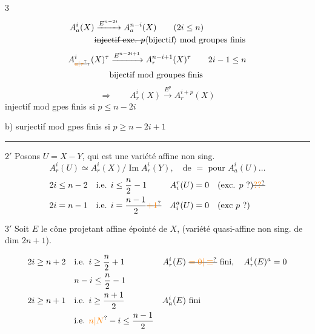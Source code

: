 \textcircled{3}
\[
\begin{aligned}
 A_a^i(X)&\xrightarrow{E^{n-2i}} A_a^{n-i}(X)\qquad(2i\leq n)\\
 &\text{\deleted{injectif exc. $p$}\inserted{bijectif} mod groupes finis}
\end{aligned}
\]
\[
\begin{aligned}
 A^i_{\deleted{\unsure{a|\tau}}r}(X)^\tau
 &\xrightarrow{E^{n-2i+1}} A_r^{n-i+1}(X)^\tau\qquad 2i-1\leq n\\
 &\text{bijectif mod groupes finis}
\end{aligned}
\]
\[
 \Longrightarrow\qquad A^i_r(X)\xrightarrow{E^p}A^{i+p}_r(X)
\]
 injectif mod gpes finis si $p\leq n-2i$

b) surjectif mod gpes finis si $p\geq n-2i+1$

\noindent\rule{\linewidth}{0.35pt}
\textcircled{$2'$} Posons $U=X-Y$, qui est une variété affine non sing.
\[
 A^i_r(U)\simeq A^i_r(X)/\operatorname{Im} A^i_r(Y),\quad
 \text{de }=\text{ pour } A^i_a(U)\ldots
\]
\[
\begin{aligned}
 2i\leq n-2&\quad\text{i.e. }i\leq\frac n2-1&
 A_i^r(U)&=0\quad(\text{exc. $p$ ?})\deleted{\unsure{??}}\\
 2i=n-1&\quad\text{i.e. }i=\frac{n-1}2\deleted{\unsure{+1}}&
 A_i^a(U)&=0\quad(\text{exc $p$ ?})
\end{aligned}
\]

\textcircled{$3'$} Soit $E$ le cône projetant affine épointé de $X$, (variété quasi-affine non sing. de dim $2n+1$).

\[
\begin{aligned}
 2i\geq n+2&\quad\text{i.e. } i\geq\frac n2+1&
 A_r^i(E)&\ \deleted{\unsure{=0|\equiv}}\text{ fini},\quad A^i_r(E)^a=0\\
 &\quad n-i\leq\frac n2-1\\
 2i\geq n+1&\quad\text{i.e. } i\geq\frac{n+1}2&
 A^i_a(E)&\ \text{fini}\\
 &\quad\text{i.e. }\unsure{n|N}-i\leq\frac{n-1}2
\end{aligned}
\]

